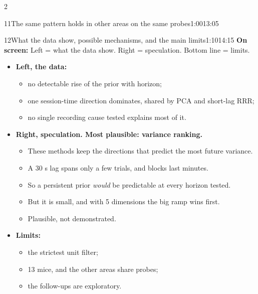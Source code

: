 \documentclass[10pt]{article}
\newcommand{\point}[1]{{\color{ink}\textbf{On screen:} #1}\par}
\begin{document}
\begin{multicols}{2}
\begin{slidebox}{11}{The same pattern holds in other areas on the same probes}{1:00}{13:05}
\end{slidebox}
\begin{slidebox}{12}{What the data show, possible mechanisms, and the main limits}{1:10}{14:15}
\point{Left = what the data show. Right = speculation. Bottom line = limits.}
\begin{itemize}
\item \textbf{Left, the data:}
  \begin{itemize}
  \item no detectable rise of the prior with horizon;
  \item one session-time direction dominates, shared by PCA and short-lag RRR;
  \item no single recording cause tested explains most of it.
  \end{itemize}
\item \textbf{Right, speculation. Most plausible: variance ranking.}
  \begin{itemize}
  \item These methods keep the directions that predict the most future variance.
  \item A 30 s lag spans only a few trials, and blocks last minutes.
  \item So a persistent prior \emph{would} be predictable at every horizon tested.
  \item But it is small, and with 5 dimensions the big ramp wins first.
  \item Plausible, not demonstrated.
  \end{itemize}
\item \textbf{Limits:}
  \begin{itemize}
  \item the strictest unit filter;
  \item 13 mice, and the other areas share probes;
  \item the follow-ups are exploratory.
  \end{itemize}
\end{itemize}


\end{slidebox}
\end{multicols}
\end{document}
